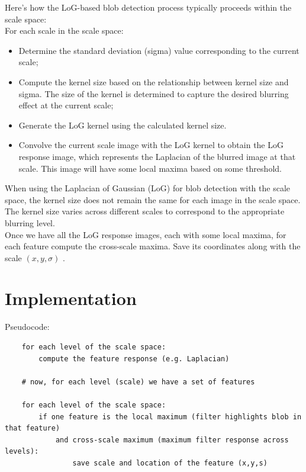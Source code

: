 \documentclass{article}
\begin{document}

Here's how the LoG-based blob detection process typically proceeds within the scale space: \\

For each scale in the scale space:
\begin{itemize}
    \item Determine the standard deviation (sigma) value corresponding to the current scale;
    \item Compute the kernel size based on the relationship between kernel size and sigma. The size of the kernel is determined to capture the desired blurring effect at the current scale;
    \item Generate the LoG kernel using the calculated kernel size.
    \item Convolve the current scale image with the LoG kernel to obtain the LoG response image, which represents the Laplacian of the blurred image at that scale. This image will have some local maxima based on some threshold.
\end{itemize}

When using the Laplacian of Gaussian (LoG) for blob detection with the scale space, the kernel size does not remain the same for each image in the scale space. The kernel size varies across different scales to correspond to the appropriate blurring level.\\

Once we have all the LoG response images, each with some local maxima, for each feature compute the cross-scale maxima. Save its coordinates along with the scale $(x, y, \sigma)$ .

\section*{Implementation}

Pseudocode:
\begin{verbatim}
    for each level of the scale space:
        compute the feature response (e.g. Laplacian)

    # now, for each level (scale) we have a set of features 

    for each level of the scale space:
        if one feature is the local maximum (filter highlights blob in that feature) 
            and cross-scale maximum (maximum filter response across levels):
                save scale and location of the feature (x,y,s)
    
\end{verbatim}
\end{document}
